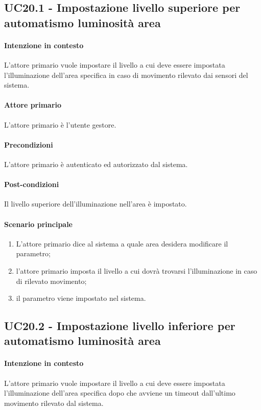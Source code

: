\subsection{UC20.1 - Impostazione livello superiore per automatismo luminosità area}\label{uc:20.1}
\paragraph{Intenzione in contesto} L'attore primario vuole impostare il livello a cui deve essere impostata l'illuminazione dell'area specifica in caso di movimento rilevato dai sensori del sistema.
\paragraph{Attore primario} L'attore primario è l'utente gestore.
\paragraph{Precondizioni}  L'attore primario è autenticato ed autorizzato dal sistema.
\paragraph{Post-condizioni} Il livello superiore dell'illuminazione nell'area è impostato.
\paragraph{Scenario principale}
\begin{enumerate}
    \item L'attore primario dice al sistema a quale area desidera modificare il parametro;
    \item l'attore primario imposta il livello a cui dovrà trovarsi l'illuminazione in caso di rilevato movimento;
    \item il parametro viene impostato nel sistema.
\end{enumerate}

\subsection{UC20.2 - Impostazione livello inferiore per automatismo luminosità area}\label{uc:20.2}

\paragraph{Intenzione in contesto} L'attore primario vuole impostare il livello a cui deve essere impostata l'illuminazione dell'area specifica dopo che avviene un timeout dall'ultimo movimento rilevato dal sistema.
